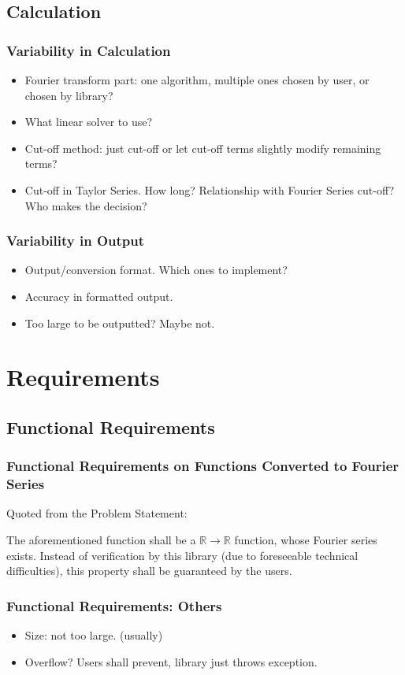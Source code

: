 \documentclass{beamer}
\begin{document}
		\subsection{Calculation}
		\begin{frame}
			\frametitle{Variability in Calculation}
			\begin{itemize}
				\item Fourier transform part: one algorithm, multiple ones chosen by user, or chosen by library?
				\item What linear solver to use?
				\item Cut-off method: just cut-off or let cut-off terms slightly modify remaining terms?
				\item Cut-off in Taylor Series. How long? Relationship with Fourier Series cut-off? Who makes the decision?
			\end{itemize}
		\end{frame}
	
		\begin{frame}
			\frametitle{Variability in Output}
			\begin{itemize}
				\item Output/conversion format. Which ones to implement?
				\item Accuracy in formatted output.
				\item Too large to be outputted? Maybe not.
			\end{itemize}
		\end{frame}
	
	\section{Requirements}
	\subsection{Functional Requirements}
	\begin{frame}
	\frametitle{Functional Requirements on Functions Converted to Fourier Series}
	Quoted from the Problem Statement:
	
	The aforementioned function shall be a $\mathbb{R}\rightarrow\mathbb{R}$ function, whose Fourier series exists. Instead of verification by this library (due to foreseeable technical difficulties), this property shall be guaranteed by the users. 
	\end{frame}
	
	
	\begin{frame}
		\frametitle{Functional Requirements: Others}
		\begin{itemize}
			\item Size: not too large. (usually)
			\item Overflow? Users shall prevent, library just throws exception.
		\end{itemize}
	\end{frame}
	
\end{document}

